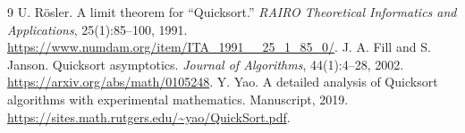 \documentclass[10pt,letterpaper]{article}
\begin{document}
\begin{thebibliography}{9}\small
{} U. R\"osler. A limit theorem for ``Quicksort.'' \emph{RAIRO Theoretical Informatics and Applications}, 25(1):85--100, 1991. \url{https://www.numdam.org/item/ITA_1991__25_1_85_0/}.
 J. A. Fill and S. Janson. Quicksort asymptotics. \emph{Journal of Algorithms}, 44(1):4--28, 2002. \url{https://arxiv.org/abs/math/0105248}.
 Y. Yao. A detailed analysis of Quicksort algorithms with experimental mathematics. Manuscript, 2019. \url{https://sites.math.rutgers.edu/~yao/QuickSort.pdf}.
\end{thebibliography}
\end{document}
